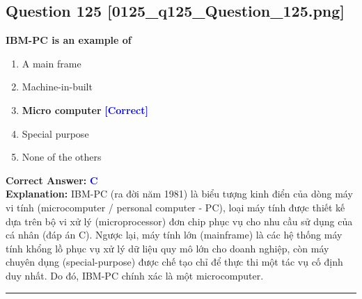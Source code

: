 \documentclass[11pt,a4paper]{article}
\begin{document}
\begin{minipage}{\textwidth}
\subsection*{Question 125 \quad \footnotesize{[0125\_q125\_Question\_125.png]}}
\noindent \textbf{IBM-PC is an example of}

\begin{enumerate}[label=\Alph*.]
    \item A main frame
    \item Machine-in-built
    \item \textbf{Micro computer} \hfill \textcolor{blue}{\textbf{[Correct]}}
    \item Special purpose
    \item None of the others
\end{enumerate}

\noindent \textbf{Correct Answer:} \textcolor{blue}{\textbf{C}} \\[2pt]
\noindent \textbf{Explanation:} IBM-PC (ra đời năm 1981) là biểu tượng kinh điển của dòng máy vi tính (microcomputer / personal computer - PC), loại máy tính được thiết kế dựa trên bộ vi xử lý (microprocessor) đơn chip phục vụ cho nhu cầu sử dụng của cá nhân (đáp án C). Ngược lại, máy tính lớn (mainframe) là các hệ thống máy tính khổng lồ phục vụ xử lý dữ liệu quy mô lớn cho doanh nghiệp, còn máy chuyên dụng (special-purpose) được chế tạo chỉ để thực thi một tác vụ cố định duy nhất. Do đó, IBM-PC chính xác là một microcomputer.

\par\vspace{0.3cm}
\hrule
\vspace{0.3cm}
\end{minipage}
\end{document}
